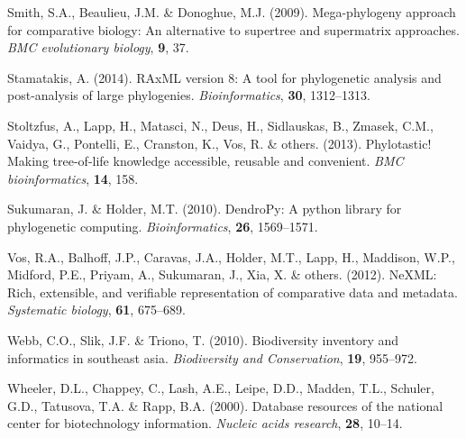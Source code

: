 \documentclass[]{article}
\begin{document}
\leavevmode\hypertarget{ref-smith2009mega}{}%
Smith, S.A., Beaulieu, J.M. \& Donoghue, M.J. (2009). Mega-phylogeny approach for comparative biology: An alternative to supertree and supermatrix approaches. \emph{BMC evolutionary biology}, \textbf{9}, 37.

\leavevmode\hypertarget{ref-stamatakis2014raxml}{}%
Stamatakis, A. (2014). RAxML version 8: A tool for phylogenetic analysis and post-analysis of large phylogenies. \emph{Bioinformatics}, \textbf{30}, 1312--1313.

\leavevmode\hypertarget{ref-stoltzfus2013phylotastic}{}%
Stoltzfus, A., Lapp, H., Matasci, N., Deus, H., Sidlauskas, B., Zmasek, C.M., Vaidya, G., Pontelli, E., Cranston, K., Vos, R. \& others. (2013). Phylotastic! Making tree-of-life knowledge accessible, reusable and convenient. \emph{BMC bioinformatics}, \textbf{14}, 158.

\leavevmode\hypertarget{ref-sukumaran2010dendropy}{}%
Sukumaran, J. \& Holder, M.T. (2010). DendroPy: A python library for phylogenetic computing. \emph{Bioinformatics}, \textbf{26}, 1569--1571.

\leavevmode\hypertarget{ref-vos2012nexml}{}%
Vos, R.A., Balhoff, J.P., Caravas, J.A., Holder, M.T., Lapp, H., Maddison, W.P., Midford, P.E., Priyam, A., Sukumaran, J., Xia, X. \& others. (2012). NeXML: Rich, extensible, and verifiable representation of comparative data and metadata. \emph{Systematic biology}, \textbf{61}, 675--689.

\leavevmode\hypertarget{ref-webb2010biodiversity}{}%
Webb, C.O., Slik, J.F. \& Triono, T. (2010). Biodiversity inventory and informatics in southeast asia. \emph{Biodiversity and Conservation}, \textbf{19}, 955--972.

\leavevmode\hypertarget{ref-wheeler2000database}{}%
Wheeler, D.L., Chappey, C., Lash, A.E., Leipe, D.D., Madden, T.L., Schuler, G.D., Tatusova, T.A. \& Rapp, B.A. (2000). Database resources of the national center for biotechnology information. \emph{Nucleic acids research}, \textbf{28}, 10--14.
\end{document}
